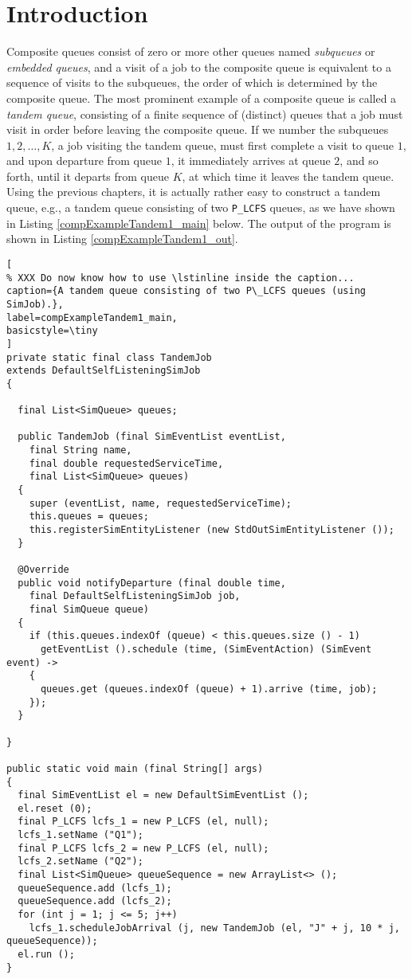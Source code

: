 \documentclass[12pt]{book}
\begin{document}
\section{Introduction}

Composite queues consist of zero or more other queues
  named {\em subqueues\/} or {\em embedded queues},
  and a visit of a job to the composite queue is
  equivalent to a sequence of visits to the subqueues,
  the order of which is determined by the composite queue.
The most prominent example of a composite queue is called a {\em tandem queue\/},
  consisting of a finite sequence of (distinct) queues that a job must visit
  in order before leaving the composite queue.
If we number the subqueues $1, 2, \ldots, K$,
  a job visiting the tandem queue, must first complete
  a visit to queue $1$, and upon departure from queue $1$,
  it immediately arrives at queue $2$, and so forth,
  until it departs from queue $K$,
  at which time it leaves the tandem queue.
Using the previous chapters,
  it is actually rather easy to construct a tandem queue,
  e.g., a tandem queue consisting of two \lstinline|P_LCFS| queues,
  as we have shown in Listing \ref{compExampleTandem1_main} below.
The output of the program is shown in Listing \ref{compExampleTandem1_out}.

\begin{lstlisting}[
% XXX Do now know how to use \lstinline inside the caption...
caption={A tandem queue consisting of two P\_LCFS queues (using SimJob).},
label=compExampleTandem1_main,
basicstyle=\tiny
]
private static final class TandemJob
extends DefaultSelfListeningSimJob
{

  final List<SimQueue> queues;
    
  public TandemJob (final SimEventList eventList,
    final String name,
    final double requestedServiceTime,
    final List<SimQueue> queues)
  {
    super (eventList, name, requestedServiceTime);
    this.queues = queues;
    this.registerSimEntityListener (new StdOutSimEntityListener ());
  }

  @Override
  public void notifyDeparture (final double time,
    final DefaultSelfListeningSimJob job,
    final SimQueue queue)
  {
    if (this.queues.indexOf (queue) < this.queues.size () - 1)
      getEventList ().schedule (time, (SimEventAction) (SimEvent event) ->
    {
      queues.get (queues.indexOf (queue) + 1).arrive (time, job);
    });
  }

}
  
public static void main (final String[] args)
{    
  final SimEventList el = new DefaultSimEventList ();
  el.reset (0);
  final P_LCFS lcfs_1 = new P_LCFS (el, null);
  lcfs_1.setName ("Q1");
  final P_LCFS lcfs_2 = new P_LCFS (el, null);
  lcfs_2.setName ("Q2");
  final List<SimQueue> queueSequence = new ArrayList<> ();
  queueSequence.add (lcfs_1);
  queueSequence.add (lcfs_2);
  for (int j = 1; j <= 5; j++)
    lcfs_1.scheduleJobArrival (j, new TandemJob (el, "J" + j, 10 * j, queueSequence));
  el.run ();
}
\end{lstlisting}
\end{document}
